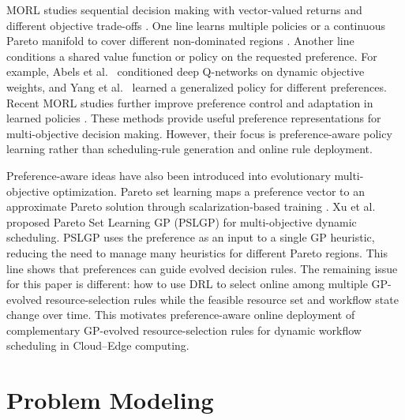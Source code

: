 \documentclass[10pt,journal]{IEEEtran}
\begin{document}
MORL studies sequential decision making with vector-valued returns and different objective trade-offs \cite{roijers2013morl,hayes2022morl}. One line learns multiple policies or a continuous Pareto manifold to cover different non-dominated regions \cite{vanmoffaert2014pareto,parisi2016pareto}. Another line conditions a shared value function or policy on the requested preference. For example, Abels et al.~\cite{abels2019morl} conditioned deep Q-networks on dynamic objective weights, and Yang et al.~\cite{yang2019morl} learned a generalized policy for different preferences. Recent MORL studies further improve preference control and adaptation in learned policies \cite{reymond2022pcn,wu2026e2morl,yang2025pcrl}. These methods provide useful preference representations for multi-objective decision making. However, their focus is preference-aware policy learning rather than scheduling-rule generation and online rule deployment.

Preference-aware ideas have also been introduced into evolutionary multi-objective optimization. Pareto set learning maps a preference vector to an approximate Pareto solution through scalarization-based training \cite{lin2022psl}. Xu et al.~\cite{xu2026pslgp} proposed Pareto Set Learning GP (PSLGP) for multi-objective dynamic scheduling. PSLGP uses the preference as an input to a single GP heuristic, reducing the need to manage many heuristics for different Pareto regions. This line shows that preferences can guide evolved decision rules. The remaining issue for this paper is different: how to use DRL to select online among multiple GP-evolved resource-selection rules while the feasible resource set and workflow state change over time. This motivates preference-aware online deployment of complementary GP-evolved resource-selection rules for dynamic workflow scheduling in Cloud--Edge computing.


\section{Problem Modeling}
\label{Sec: problem modeling}
\end{document}
